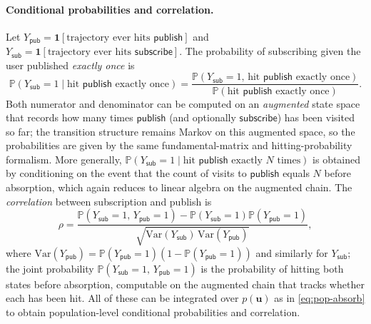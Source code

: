 \paragraph{Conditional probabilities and correlation.}
Let $Y_{\mathsf{pub}} = \mathbf{1}[\text{trajectory ever hits }\mathsf{publish}]$ and $Y_{\mathsf{sub}} = \mathbf{1}[\text{trajectory ever hits }\mathsf{subscribe}]$. The probability of subscribing given the user published \emph{exactly once} is
\begin{equation}
  \mathbb{P}(Y_{\mathsf{sub}} = 1 \mid \text{hit }\mathsf{publish}\text{ exactly once}) = \frac{\mathbb{P}(Y_{\mathsf{sub}} = 1,\, \text{hit }\mathsf{publish}\text{ exactly once})}{\mathbb{P}(\text{hit }\mathsf{publish}\text{ exactly once})}. \label{eq:sub-given-pub-once}
\end{equation}
Both numerator and denominator can be computed on an \emph{augmented} state space that records how many times $\mathsf{publish}$ (and optionally $\mathsf{subscribe}$) has been visited so far; the transition structure remains Markov on this augmented space, so the probabilities are given by the same fundamental-matrix and hitting-probability formalism. More generally, $\mathbb{P}(Y_{\mathsf{sub}} = 1 \mid \text{hit }\mathsf{publish}\text{ exactly }N\text{ times})$ is obtained by conditioning on the event that the count of visits to $\mathsf{publish}$ equals $N$ before absorption, which again reduces to linear algebra on the augmented chain. The \emph{correlation} between subscription and publish is
\begin{equation}
  \rho = \frac{\mathbb{P}(Y_{\mathsf{sub}} = 1,\, Y_{\mathsf{pub}} = 1) - \mathbb{P}(Y_{\mathsf{sub}} = 1)\mathbb{P}(Y_{\mathsf{pub}} = 1)}{\sqrt{\mathrm{Var}(Y_{\mathsf{sub}})\,\mathrm{Var}(Y_{\mathsf{pub}})}}, \label{eq:correlation}
\end{equation}
where $\mathrm{Var}(Y_{\mathsf{pub}}) = \mathbb{P}(Y_{\mathsf{pub}} = 1)(1 - \mathbb{P}(Y_{\mathsf{pub}} = 1))$ and similarly for $Y_{\mathsf{sub}}$; the joint probability $\mathbb{P}(Y_{\mathsf{sub}} = 1,\, Y_{\mathsf{pub}} = 1)$ is the probability of hitting both states before absorption, computable on the augmented chain that tracks whether each has been hit. All of these can be integrated over $p(\mathbf{u})$ as in \eqref{eq:pop-absorb} to obtain population-level conditional probabilities and correlation.


